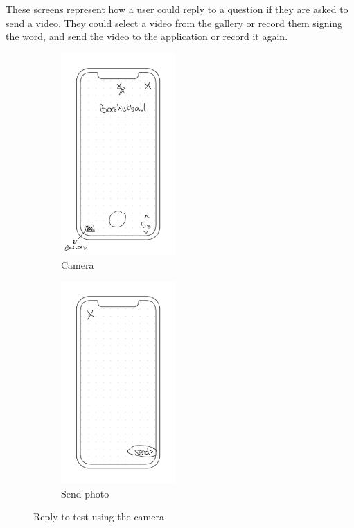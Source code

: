 These screens represent how a user could reply to a question if they are asked to send a video. They could select a video from the gallery or record them signing the word, and send the video to the application or record it again. \\
\begin{figure}[H]
    \centering
    \begin{subfigure}[T]{0.49\textwidth}
        \centering
        \includegraphics[width=0.48\textwidth]{assets/screens/quiz/quiz-camera/Quiz - Camera.png}
        \caption{Camera}
        \label{fig:design_screen_camera}
    \end{subfigure}
    \hfill
    \begin{subfigure}[T]{0.49\textwidth}
        \centering
        \includegraphics[width=0.48\textwidth]{assets/screens/quiz/quiz-camera/Quiz - Camera send.png}
        \caption{Send photo}
        \label{fig:design_screen_camera_send}
    \end{subfigure}
       \caption{Reply to test using the camera}
       \label{fig:design_camera}
\end{figure}

